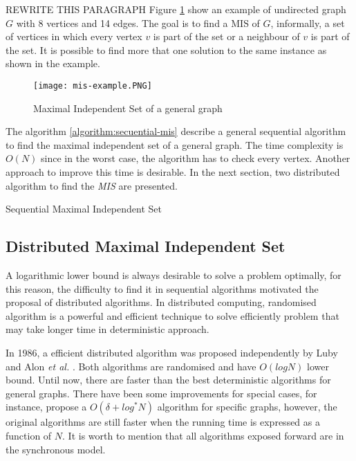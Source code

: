 REWRITE THIS PARAGRAPH
Figure \ref{fig:graph1} show an example of undirected graph $G$ with 8 vertices and 14 edges. The goal is to find a MIS of $G$, informally, a set of vertices in which every vertex $v$ is part of the set or a neighbour of $v$ is part of the set. It is possible to find more that one solution to the same instance as shown in the example.
 
\begin{figure}[ht]
\centering
\texttt{[image: mis-example.PNG]} 
\caption{Maximal Independent Set of a general graph}
\label{fig:graph1}
\end{figure}


The algorithm \ref{algorithm:secuential-mis} describe a general sequential algorithm to find the maximal independent set of a general graph. The time complexity is $O(N)$ since in the worst case, the algorithm has to check every vertex. Another approach to improve this time is desirable. In the next section, two distributed algorithm to find the \textit{MIS} are presented.

\begin{algorithm}
 \caption{Sequential Maximal Independent Set}
 \label{algorithm:secuential-mis} 

\SetAlgoNoLine
{}
    
 
\end{algorithm}
 
 


 
\subsection{Distributed Maximal Independent Set}

A logarithmic lower bound is always desirable to solve a problem optimally, for this reason, the difficulty to find it in sequential algorithms motivated the proposal of distributed algorithms. In distributed computing, randomised algorithm is a powerful and efficient technique to solve efficiently problem that may take longer time in deterministic approach.

In 1986, a efficient distributed algorithm was proposed independently by Luby \cite{luby1986simple} and Alon \textit{et al.} \cite{alon1986fast}. Both algorithms are randomised and have $O(log N)$ lower bound. Until now, there are faster than the best deterministic algorithms for general graphs. There have been some improvements for special cases, for instance, \cite{panconesi1996complexity} propose a $O(\delta + log^* N)$ algorithm for specific graphs, however, the original algorithms are still faster when the running time is expressed as a function of $N$. It is worth to mention that all algorithms exposed forward are in the synchronous model.  

